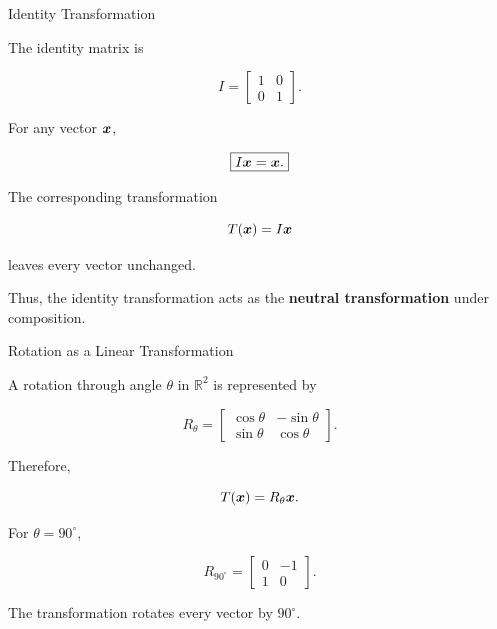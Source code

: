 \begin{frame}{Identity Transformation}

The identity matrix is

\[
I=
\begin{bmatrix}
1&0\\
0&1
\end{bmatrix}.
\]

For any vector $\bm{x}$,

\[
\boxed{
I\bm{x}=\bm{x}.
}
\]

The corresponding transformation

\[
T(\bm{x})=I\bm{x}
\]

leaves every vector unchanged.
\vspace{0.1cm}

Thus, the identity transformation acts as the
\textbf{neutral transformation} under composition.

\end{frame}



\begin{frame}{Rotation as a Linear Transformation}

A rotation through angle $\theta$ in $\mathbb{R}^2$ is represented by

\[
\boxed{
R_\theta
=
\begin{bmatrix}
\cos\theta & -\sin\theta\\
\sin\theta & \cos\theta
\end{bmatrix}.
}
\]

Therefore,

\[
T(\bm{x})
=
R_\theta\bm{x}.
\]

\vspace{0.4cm}

For $\theta=90^\circ$,

\[
R_{90^\circ}
=
\begin{bmatrix}
0&-1\\
1&0
\end{bmatrix}.
\]

\vspace{0.3cm}

The transformation rotates every vector by $90^\circ$.

\end{frame}



